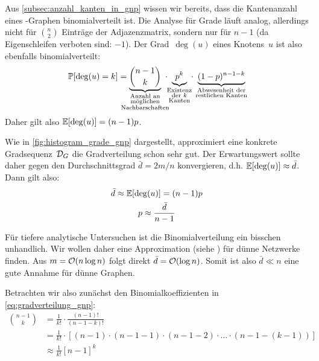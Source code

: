 Aus \cref{subsec:anzahl_kanten_in_gnp} wissen wir bereits, dass die Kantenanzahl eines \Gnp-Graphen binomialverteilt ist.
Die Analyse für Grade läuft analog, allerdings nicht für $\binom n 2$ Einträge der Adjazenzmatrix, sondern nur für $n-1$ (da Eigenschleifen verboten sind: $-1$).
Der Grad~$\deg(u)$ eines Knotens~$u$ ist also ebenfalls binomialverteilt:
\begin{equation}
    \prob{\deg(u) = k} =
    \underbrace{\binom{n-1}{k}}_{\mathclap{\substack{\text{Anzahl an} \\ \text{möglichen} \\ \text{Nachbarschaften}}}}
    \ \cdot \ %
    \underbrace{p^k\mathstrut}_{\mathclap{\substack{\text{Existenz} \\ \text{der $k$} \\ \text{Kanten}}}}
    \ \cdot \ %
    \underbrace{(1-p)^{n-1-k}}_{\mathclap{\substack{\text{Abwesenheit der} \\ \text{restlichen Kanten}}}}
    \label{eq:gradverteilung_gnp}
\end{equation}
Daher gilt also $\mathbb{E}\!\left[\deg(u)\right] = (n-1)p$.

Wie in \cref{fig:histogram_grade_gnp} dargestellt, approximiert eine konkrete Gradsequenz~$\mathcal{D}_G$ die Gradverteilung schon sehr gut.
Der Erwartungswert sollte daher gegen den Durchschnittsgrad $\bar d = 2m / n$ konvergieren, d.h. $\mathbb{E}\!\left[\deg(u)\right] \approx \bar d$.
Dann gilt also:
\begin{gather}
    \bar d \approx \mathbb{E}\!\left[\deg(u)\right] = (n-1)p \\
    p \approx \frac{\bar d}{n-1} \label{eq:gnp_p_von_avg_deg}
\end{gather}

Für tiefere analytische Untersuchen ist die Binomialverteilung ein bisschen unhandlich.
Wir wollen daher eine Approximation (siehe \cite{barabasi2014network}) für dünne Netzwerke finden.
Aus $m = \mathcal{O}\!\left(n \log n\right)$ folgt direkt $\bar d = \mathcal{O}\!\left(\log n\right)$.
Somit ist also $\bar d \ll n$ eine gute Annahme für dünne Graphen.

\medskip

Betrachten wir also zunächst den Binomialkoeffizienten in \cref{eq:gradverteilung_gnp}:
\begin{align}
    \binom{n-1}{k}
     & = \frac{1}{k!} \cdot \frac{(n-1)!}{(n-1-k)!}                                                              \\
     & = \frac{1}{k!} \cdot \left[ (n-1) \cdot (n-1-1) \cdot (n-1-2) \cdot \ldots \cdot (n-1-(k - 1))    \right] \\
     & \approx \frac{1}{k!} \left[ n- 1 \right]^k
\end{align}

